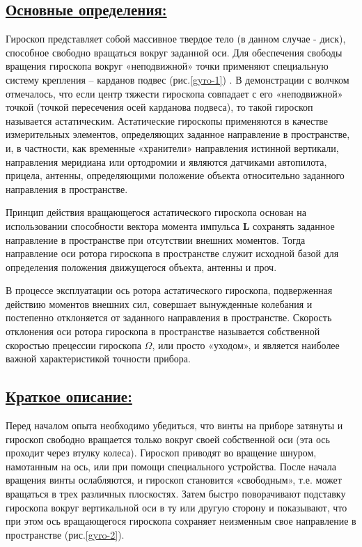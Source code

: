 \documentclass[14pt,a4paper,oneside]{extarticle}	%
\begin{document}
		\subsection*{\underline{Основные определения:}}
		
		Гироскоп представляет собой массивное твердое тело (в данном случае - диск), способное свободно вращаться вокруг заданной оси. 
		Для обеспечения свободы вращения гироскопа вокруг «неподвижной» точки применяют специальную систему крепления -- карданов подвес (рис.\ref{gyro-1}) .
		В демонстрации с волчком отмечалось, что если центр тяжести гироскопа совпадает с его «неподвижной» точкой (точкой пересечения осей карданова подвеса), то такой гироскоп называется астатическим.
		Астатические гироскопы применяются в качестве измерительных элементов, определяющих заданное направление в пространстве, и, в частности, как временные «хранители» направления истинной вертикали, направления меридиана или ортодромии и являются датчиками автопилота, прицела, антенны, определяющими положение объекта относительно заданного направления в пространстве.
		
		Принцип действия вращающегося астатического гироскопа основан на использовании способности вектора момента импульса \textbf{L} сохранять заданное направление в пространстве при отсутствии внешних моментов.
		Тогда направление оси ротора гироскопа в пространстве служит исходной базой для определения положения движущегося объекта, антенны и проч.
		
		В процессе эксплуатации ось ротора астатического гироскопа, подверженная действию моментов внешних сил, совершает вынужденные колебания и постепенно отклоняется от заданного направления в пространстве.		
		Скорость отклонения оси ротора гироскопа в пространстве называется собственной скоростью прецессии гироскопа $ \Omega $, или просто «уходом», и является наиболее важной характеристикой точности прибора.

	\subsection*{\underline{Краткое описание:}}
	
	Перед началом опыта необходимо убедиться, что винты на приборе затянуты и гироскоп свободно вращается только вокруг своей собственной оси (эта ось проходит через втулку колеса).
	Гироскоп приводят во вращение шнуром, намотанным на ось, или при помощи специального устройства.
	После начала вращения винты ослабляются, и гироскоп становится «свободным», т.е. может вращаться в трех различных плоскостях.
	Затем быстро поворачивают подставку гироскопа вокруг вертикальной оси в ту или другую сторону и показывают, что при этом ось вращающегося гироскопа сохраняет неизменным свое направление в пространстве (рис.\ref{gyro-2}).
	
\end{document}
